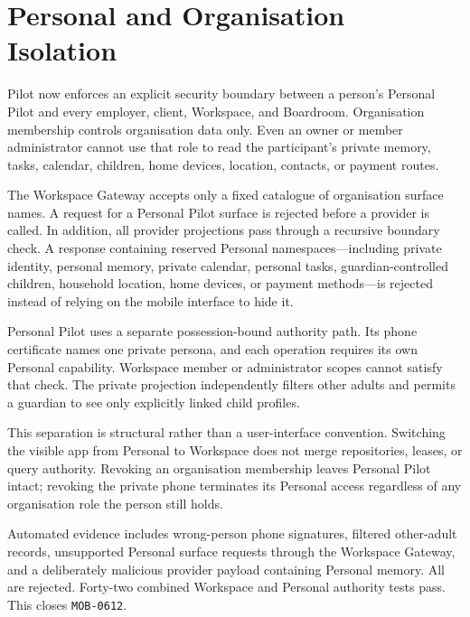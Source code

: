 \section{Personal and Organisation Isolation}
\label{sec:pilot-mobile-personal-organisation-isolation}
\raggedright

Pilot now enforces an explicit security boundary between a person's Personal Pilot and every
employer, client, Workspace, and Boardroom.  Organisation membership controls organisation data
only.  Even an owner or member administrator cannot use that role to read the participant's
private memory, tasks, calendar, children, home devices, location, contacts, or payment routes.

The Workspace Gateway accepts only a fixed catalogue of organisation surface names.  A request for
a Personal Pilot surface is rejected before a provider is called.  In addition, all provider
projections pass through a recursive boundary check.  A response containing reserved Personal
namespaces---including private identity, personal memory, private calendar, personal tasks,
guardian-controlled children, household location, home devices, or payment methods---is rejected
instead of relying on the mobile interface to hide it.

Personal Pilot uses a separate possession-bound authority path.  Its phone certificate names one
private persona, and each operation requires its own Personal capability.  Workspace member or
administrator scopes cannot satisfy that check.  The private projection independently filters
other adults and permits a guardian to see only explicitly linked child profiles.

This separation is structural rather than a user-interface convention.  Switching the visible app
from Personal to Workspace does not merge repositories, leases, or query authority.  Revoking an
organisation membership leaves Personal Pilot intact; revoking the private phone terminates its
Personal access regardless of any organisation role the person still holds.

Automated evidence includes wrong-person phone signatures, filtered other-adult records,
unsupported Personal surface requests through the Workspace Gateway, and a deliberately malicious
provider payload containing Personal memory.  All are rejected.  Forty-two combined Workspace and
Personal authority tests pass.  This closes \texttt{MOB-0612}.
